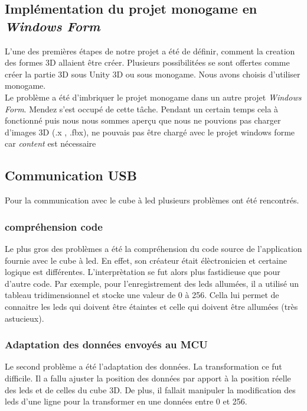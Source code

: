 \documentclass[a4paper,12pt]{article}
\begin{document}
\subsection{Implémentation du projet monogame en \textit{Windows Form}}

L'une des premières étapes de notre projet a été de définir, comment la creation des formes 3D allaient être créer. Plusieurs possibilitées se sont offertes comme créer la partie 3D sous Unity 3D ou sous monogame. Nous avons choisis d'utiliser monogame. \\

Le problème a été d'imbriquer le projet monogame dans un autre projet \textit{Windows Form}. Mendez s'est occupé de cette tâche. Pendant un certain temps cela à fonctionné puis nous nous sommes aperçu que nous ne pouvions pas charger d'images 3D (.x , .fbx), ne pouvais pas être chargé avec le projet windows forme car \textit{content} est nécessaire

\subsection{Communication USB}
Pour la communication avec le cube à led plusieurs problèmes ont été rencontrés.

\subsubsection{compréhension code}
Le plus gros des problèmes a été la compréhension du code source de l'application fournie avec le cube à led. En effet, son créateur était élèctronicien et certaine logique est différentes. L'interprètation se fut alors plus fastidieuse que pour d'autre code. Par exemple, pour l'enregistrement des leds allumées, il a utilisé un tableau tridimensionnel et stocke une valeur de 0 à 256. Cella lui permet de connaitre les leds qui doivent être étaintes et celle qui doivent être allumées (très astucieux).

\subsubsection{Adaptation des données envoyés au MCU}
Le second problème a été l'adaptation des données. La transformation ce fut difficile. Il a fallu ajuster la position des données par apport à la position réelle des leds et de celles du cube 3D. De plus, il fallait manipuler la modification des leds d'une ligne pour la transformer en une données entre 0 et 256.
\end{document}
